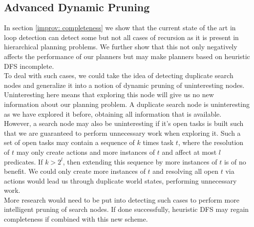 \subsection{Advanced Dynamic Pruning}
In section \ref{improv: completeness} we show that the current state of the art in loop detection can detect some but not all cases of recursion as it is present in hierarchical planning problems. We further show that this not only negatively affects the performance of our planners but may make planners based on heuristic DFS incomplete. \\
To deal with such cases, we could take the idea of detecting duplicate search nodes and generalize it into a notion of dynamic pruning of uninteresting nodes. Uninteresting here means that exploring this node will give us no new information about our planning problem. A duplicate search node is uninteresting as we have explored it before, obtaining all information that is available. However, a search node may also be uninteresting if it's open tasks is built such that we are guaranteed to perform unnecessary work when exploring it. Such a set of open tasks may contain a sequence of $k$ times task $t$, where the resolution of $t$ may only create actions and more instances of $t$ and affect at most $l$ predicates. If $k > 2^l$, then extending this sequence by more instances of $t$ is of no benefit. We could only create more instances of $t$ and resolving all open $t$ via actions would lead us through duplicate world states, performing unnecessary work. \\
More research would need to be put into detecting such cases to perform more intelligent pruning of search nodes. If done successfully, heuristic DFS may regain completeness if combined with this new scheme.
\begin{comment}
- some planners are known to not be complete
- some planners can easily be shown to be complete
- we make a case in section \todo{Ref where we destroy our own heuristic and PANDA} that heuristic planners may not be complete
- to catch these cases planners may have to get more intelligent about which parts of the search space to cut off
- else we may have to adapt our search algorithms to enforce completeness at another level
- similarly we may achieve completeness by simply cutting off the search once we get too deep \todo{cite exponential max depth}
- however, this may be theoretically complete but also hits us with the full expense of an EXPSPACE-hard problem, i.e. we may never realistically reach this condition (except on very small problems)
- similarly it is not clear whether an algorithm like heuristic + plan length search gives us completeness in feasible time or more theoretically \todo{Compare with results once they arrive}
- HyperTensioN, a decidedly non-complete planner is also the best-rated planner in the IPC 2020
- maybe we need to have a full conversation on how much completeness we actually want/ need (or two separate categories of planners between 'HTN as a way to provide advice into planning domains \todo{quote Erol, I think?}' and 'HTN for the full power it provides')

- new loop detection techniques leading to planner completeness
\end{comment}

